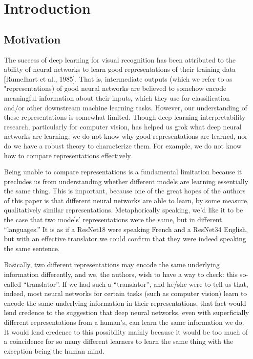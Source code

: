 \documentclass{article} %
\begin{document}
\section*{Introduction}
\subsection*{Motivation}
The success of deep learning for visual recognition has been attributed to the ability of neural networks to learn
good representations of their training data [Rumelhart et al., 1985]. That is, intermediate outputs (which we refer
to as "representations) of good neural networks 
are believed to somehow encode meaningful information about their inputs, which they use for classification and/or other
downstream machine learning tasks. However, our understanding of these representations is somewhat limited. Though
deep learning interpretability research, particularly for computer vision, has helped us grok what deep neural 
networks are learning, we do not
know why good representations are learned, nor do we have a robust theory to characterize them. For example, we do not
know how to compare representations effectively.

Being unable to compare representations is a fundamental limitation because it precludes us from understanding whether
different models are learning essentially the same thing. This is important, because one of the great hopes of the authors
of this paper is that
different neural networks are able to learn, by some measure, qualitatively similar representations. Metaphorically speaking,
we'd like it to be the case that two models' representations were the same, but in different ``languages.'' It is as if
a ResNet18 were speaking French and a ResNet34 English, but with an effective translator we could confirm that they were
indeed speaking the same sentence.

Basically, two different representations may encode the same underlying information differently, and we, the authors,
wish to have a way to check: this so-called ``translator''. If we had such a ``translator'', and he/she were to tell
us that, indeed, most neural networks for certain tasks (such as computer vision) learn to encode the same
underlying information in their representations, that fact would lend credence to the suggestion that deep neural
networks, even with superficially different representations from a human's, can learn the same information we do.
It would
lend credence to this possibility mainly because it would be too much of a coincidence for so many different learners
to learn the same thing with the exception being the human mind.
\end{document}

